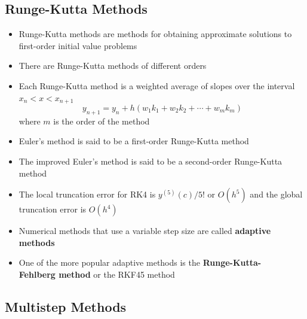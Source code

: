 \documentclass{article}
\begin{document}
\subsection{Runge-Kutta Methods}

\begin{itemize}
  \item Runge-Kutta methods are methods for obtaining approximate solutions to first-order initial value problems

  \item There are Runge-Kutta methods of different orders

  \item Each Runge-Kutta method is a weighted average of slopes over the interval $x_n < x < x_{n + 1}$ \[y_{n + 1} = y_n + h (w_1 k_1 + w_2 k_2+ \cdots + w_m k_m)\] where $m$ is the order of the method

  \item Euler's method is said to be a first-order Runge-Kutta method

  \item The improved Euler's method is said to be a second-order Runge-Kutta method

  \item The local truncation error for RK4 is $y^{(5)}(c)/5!$ or $O(h^5)$ and the global truncation error is $O(h^4)$

  \item Numerical methods that use a variable step size are called \textbf{adaptive methods}

  \item One of the more popular adaptive methods is the \textbf{Runge-Kutta-\\Fehlberg method} or the RKF45 method
\end{itemize}

\subsection{Multistep Methods}
\end{document}
